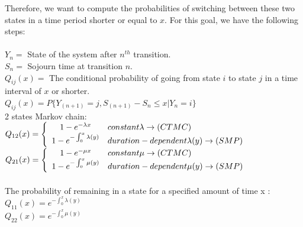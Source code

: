 \documentclass[12pt,letterpaper]{article}
\begin{document}
Therefore, we want to compute the probabilities of switching between these two states in a time period shorter or equal to $x $. For this goal, we have the following steps:\\
\\
$Y_n=$ State of the system after $n^{th}$ transition.\\
$S_n=$ Sojourn time at transition $n$.\\
$Q_{ij} (x)=$ The conditional probability of going from state $i$ to state $j$ in a time interval of $x$ or shorter.\\
$Q_{ij} (x)=P\{Y_{(n+1)}=j,S_{(n+1)}-S_n\le x|Y_n=i\}$\\
2 states Markov chain:\\

$Q_{12} (x)=\left\{
\begin{array}{c l}      
    1-e^{-\lambda x} &  constant \lambda\rightarrow (CTMC)\\
    1-e^{-\int_{0}^{x} \lambda (y)} & duration-dependent   \lambda(y)\rightarrow     (SMP)
\end{array}\right.$\\


$Q_{21} (x)=\left\{
\begin{array}{c l}      
    1-e^{-\mu x} &  constant \mu\rightarrow (CTMC)\\
    1-e^{-\int_{0}^{x} \mu (y)} & duration-dependent   \mu(y)\rightarrow     (SMP)
\end{array}\right.$\\
\\
The probability of remaining in a state for a specified amount of time x :\\
$Q_{11} (x)=e^{-\int_{0}^{x} \lambda (y)}$\\
$Q_{22} (x)=e^{-\int_{0}^{x} \mu (y)}$
\end{document}
